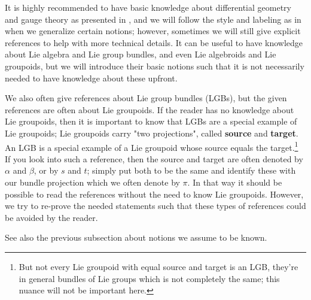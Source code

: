 \documentclass[a4paper,oneside,11pt,bibliography=totoc]{scrartcl}
\theoremstyle{plain}
\theoremstyle{remark}
\theoremstyle{definition}
\begin{document}
It is highly recommended to have basic knowledge about differential geometry and gauge theory as presented in \cite[especially Chapter 1 to 5]{Hamilton}, and we will follow the style and labeling as in \cite{Hamilton} when we generalize certain notions; however, sometimes we will still give explicit references to help with more technical details. It can be useful to have knowledge about Lie algebra and Lie group bundles, and even Lie algebroids and Lie groupoids, but we will introduce their basic notions such that it is not necessarily needed to have knowledge about these upfront.

We also often give references about Lie group bundles (LGBs), but the given references are often about Lie groupoids. If the reader has no knowledge about Lie groupoids, then it is important to know that LGBs are a special example of Lie groupoids; Lie groupoids carry "two projections", called \textbf{source} and \textbf{target}. An LGB is a special example of a Lie groupoid whose source equals the target.\footnote{But not every Lie groupoid with equal source and target is an LGB, they're in general bundles of Lie groups which is not completely the same; this nuance will not be important here.} If you look into such a reference, then the source and target are often denoted by $\alpha$ and $\beta$, or by $s$ and $t$; simply put both to be the same and identify these with our bundle projection which we often denote by $\pi$. In that way it should be possible to read the references without the need to know Lie groupoids. However, we try to re-prove the needed statements such that these types of references could be avoided by the reader.

See also the previous subsection about notions we assume to be known.

\end{document}
